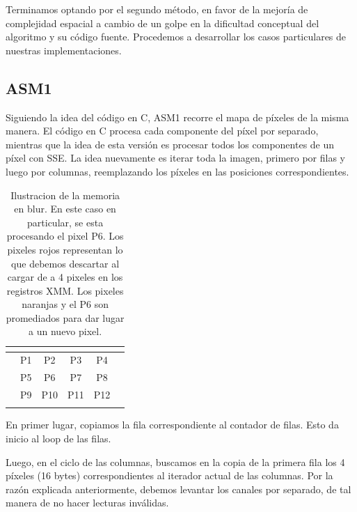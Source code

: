 Terminamos optando por el segundo método, en favor de la mejoría de complejidad espacial a cambio de un golpe en la dificultad conceptual del algoritmo y su código fuente. Procedemos a desarrollar los casos particulares de nuestras implementaciones.

\subsection{ASM1}

Siguiendo la idea del código en C, ASM1 recorre el mapa de píxeles de la misma manera. El código en C procesa cada componente del píxel por separado, mientras que la idea de esta versión es procesar todos los componentes de un píxel con SSE. La idea nuevamente es iterar toda la imagen, primero por filas y luego por columnas, reemplazando los píxeles en las posiciones correspondientes.

\begin{table}[h]
\centering
\mem
\begin{tabular}{l|c|c|c|c|l}
 & \multicolumn{1}{l|}{}      & \multicolumn{1}{l|}{}       & \multicolumn{1}{l|}{}       & \multicolumn{1}{l|}{}       &  \\ \hline
 & \cellcolor[HTML]{FFCB2F}P1 & \cellcolor[HTML]{FFCB2F}P2  & \cellcolor[HTML]{FFCB2F}P3  & \cellcolor[HTML]{FD6864}P4  &  \\ \hline
 & \cellcolor[HTML]{FFCB2F}P5 & \cellcolor[HTML]{FFFC9E}P6  & \cellcolor[HTML]{FFCB2F}P7  & \cellcolor[HTML]{FD6864}P8  &  \\ \hline
 & \cellcolor[HTML]{FFCB2F}P9 & \cellcolor[HTML]{FFCB2F}P10 & \cellcolor[HTML]{FFCB2F}P11 & \cellcolor[HTML]{FD6864}P12 &  \\ \hline
 & \multicolumn{1}{l|}{}      & \multicolumn{1}{l|}{}       & \multicolumn{1}{l|}{}       & \multicolumn{1}{l|}{}       & 
\end{tabular}
\caption{Ilustracion de la memoria en blur. En este caso en particular, se esta procesando el pixel P6. Los pixeles rojos representan lo que debemos descartar al cargar de a 4 pixeles en los registros XMM. Los pixeles naranjas y el P6 son promediados para dar lugar a un nuevo pixel.}
\end{table}

En primer lugar, copiamos la fila correspondiente al contador de filas. Esto da inicio al loop de las filas.


Luego, en el ciclo de las columnas, buscamos en la copia de la primera fila los 4 píxeles (16 bytes) correspondientes al iterador actual de las columnas.
Por la razón explicada anteriormente, debemos levantar los canales por separado, de tal manera de no hacer lecturas inválidas. 

